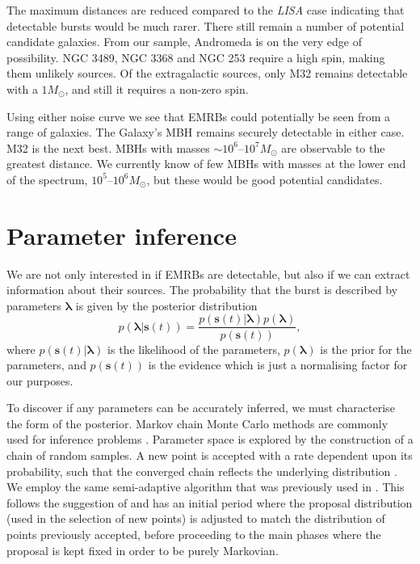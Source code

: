 \documentclass[useAMS,usedcolumn,usegraphicx,usenatbib]{mn2e}
\begin{document}
The maximum distances are reduced compared to the \textit{LISA} case indicating that detectable bursts would be much rarer. There still remain a number of potential candidate galaxies. From our sample, Andromeda is on the very edge of possibility. NGC 3489, NGC 3368 and NGC 253 require a high spin, making them unlikely sources. Of the extragalactic sources, only M32 remains detectable with a $1 M_\odot$, and still it requires a non-zero spin.

Using either noise curve we see that EMRBs could potentially be seen from a range of galaxies. The Galaxy's MBH remains securely detectable in either case. M32 is the next best. MBHs with masses $\sim 10^6$--$10^7 M_\odot$ are observable to the greatest distance. We currently know of few MBHs with masses at the lower end of the spectrum, $10^5$--$10^6 M_\odot$, but these would be good potential candidates.

\section{Parameter inference}\label{sec:MCMC}

We are not only interested in if EMRBs are detectable, but also if we can extract information about their sources. The probability that the burst is described by parameters $\boldsymbol{\lambda}$ is given by the posterior distribution
\begin{equation}
p(\boldsymbol{\lambda}|\boldsymbol{s}(t)) = \frac{p(\boldsymbol{s}(t)|\boldsymbol{\lambda})p(\boldsymbol{\lambda})}{p(\boldsymbol{s}(t))},
\end{equation}
where $p(\boldsymbol{s}(t)|\boldsymbol{\lambda})$ is the likelihood of the parameters, $p(\boldsymbol{\lambda})$ is the prior for the parameters, and $p(\boldsymbol{s}(t))$ is the evidence which is just a normalising factor for our purposes.

To discover if any parameters can be accurately inferred, we must characterise the form of the posterior. Markov chain Monte Carlo methods are commonly used for inference problems \citep[chapter 29]{MacKay2003}. Parameter space is explored by the construction of a chain of random samples. A new point is accepted with a rate dependent upon its probability, such that the converged chain reflects the underlying distribution \citep{Metropolis1953,Hastings1970}. We employ the same semi-adaptive algorithm that was previously used in \citet{Berry2013}. This follows the suggestion of \citet{Haario1999} and has an initial period where the proposal distribution (used in the selection of new points) is adjusted to match the distribution of points previously accepted, before proceeding to the main phases where the proposal is kept fixed in order to be purely Markovian.
\end{document}
